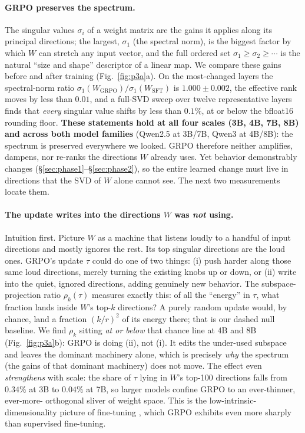 \documentclass{article}
\newcommand{\tv}{\tau}
\newcommand{\Wsft}{W_{\mathrm{SFT}}}
\newcommand{\Wg}{W_{\mathrm{GRPO}}}
\begin{document}
\paragraph{GRPO preserves the spectrum.} The singular values $\sigma_i$ of a weight matrix are the
gains it applies along its principal directions; the largest, $\sigma_1$ (the spectral norm), is
the biggest factor by which $W$ can stretch any input vector, and the full ordered set
$\sigma_1\!\geq\!\sigma_2\!\geq\!\cdots$ is the natural ``size and shape'' descriptor of a linear
map. We compare these gains before and after training (Fig.~\ref{fig:p3a}a). On the most-changed
layers the spectral-norm ratio $\sigma_1(\Wg)/\sigma_1(\Wsft)$ is $1.000\pm0.002$, the effective
rank moves by less than $0.01$, and a full-SVD sweep over twelve representative layers finds that
\emph{every} singular value shifts by less than $0.1\%$, at or below the bfloat16 rounding floor.
\textbf{These statements hold at all four scales (3B, 4B, 7B, 8B) and across both model families}
(Qwen2.5 at 3B/7B, Qwen3 at 4B/8B): the spectrum is preserved everywhere we looked. GRPO therefore
neither amplifies, dampens, nor re-ranks the directions $W$ already uses. Yet behavior demonstrably
changes (\S\ref{sec:phase1}--\S\ref{sec:phase2}), so the entire learned change must live in
directions that the SVD of $W$ alone cannot see. The next two measurements locate them.

\paragraph{The update writes into the directions $W$ was \emph{not} using.} Intuition first.
Picture $W$ as a machine that listens loudly to a handful of input directions and mostly ignores
the rest. Its top singular directions are the loud ones. GRPO's update $\tv$ could do one of two
things: (i) push harder along those same loud directions, merely turning the existing knobs up or
down, or (ii) write into the quiet, ignored directions, adding genuinely new behavior. The
subspace-projection ratio $\rho_k(\tv)$ measures exactly this: of all the ``energy'' in $\tv$,
what fraction lands inside $W$'s top-$k$ directions? A purely random update would, by chance, land a
fraction $(k/r)^2$ of its energy there; that is our dashed null baseline. We find $\rho_k$ sitting
\emph{at or below} that chance line at 4B and 8B (Fig.~\ref{fig:p3a}b): GRPO is doing (ii), not (i).
It edits the under-used subspace and leaves the dominant machinery alone, which is precisely
\emph{why} the spectrum (the gains of that dominant machinery) does not move. The effect even
\emph{strengthens} with scale: the share of $\tv$ lying in $W$'s top-100 directions falls from
$0.34\%$ at 3B to $0.04\%$ at 7B, so larger models confine GRPO to an ever-thinner, ever-more-
orthogonal sliver of weight space. This is the low-intrinsic-dimensionality picture of fine-tuning
\citep{aghajanyan2021intrinsic,hu2022lora}, which GRPO exhibits even more sharply than supervised
fine-tuning.
\end{document}
